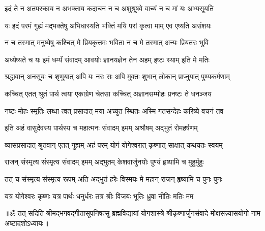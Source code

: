 \twolineshloka
{इदं ते न अतपस्काय न अभक्ताय कदाचन}
{न च अशुश्रूषवे वाच्यं न च मां यः अभ्यसूयति}%

\twolineshloka
{यः इदं परमं गुह्यं मद्भक्तेषु अभिधास्यति}
{भक्तिं मयि परां कृत्वा माम् एव एष्यति असंशयः}%

\twolineshloka
{न च तस्मात् मनुष्येषु कश्चित् मे प्रियकृत्तमः}
{भविता न च मे तस्मात् अन्यः प्रियतरः भुवि}%

\twolineshloka
{अध्येष्यते च यः इमं धर्म्यं संवादम् आवयोः}
{ज्ञानयज्ञेन तेन अहम् इष्टः स्याम् इति मे मतिः}%

\twolineshloka
{श्रद्धावान् अनसूयः च शृणुयात् अपि यः नरः}
{सः अपि मुक्तः शुभान् लोकान् प्राप्नुयात् पुण्यकर्मणाम्}%

\twolineshloka
{कच्चित् एतत् श्रुतं पार्थ त्वया एकाग्रेण चेतसा}
{कच्चित् अज्ञानसम्मोहः प्रनष्टः ते धनञ्जय}%


\twolineshloka
{नष्टः मोहः स्मृतिः लब्धा त्वत् प्रसादात् मया अच्युत}
{स्थितः अस्मि गतसन्देहः करिष्ये वचनं तव}%


\twolineshloka
{इति अहं वासुदेवस्य पार्थस्य च महात्मनः}
{संवादम् इमम् अश्रौषम् अद्भुतं रोमहर्षणम्}%

\twolineshloka
{व्यासप्रसादात् श्रुतवान् एतत् गुह्यम् अहं परम्}
{योगं योगेश्वरात् कृष्णात् साक्षात् कथयतः स्वयम्}%

\twolineshloka
{राजन् संस्मृत्य संस्मृत्य संवादम् इमम् अद्भुतम्}
{केशवार्जुनयोः पुण्यं हृष्यामि च मुहुर्मुहुः}%

\twolineshloka
{तत् च संस्मृत्य संस्मृत्य रूपम् अति अद्भुतं हरेः}
{विस्मयः मे महान् राजन् हृष्यामि च पुनः पुनः}%

\twolineshloka
{यत्र योगेश्वरः कृष्णः यत्र पार्थः धनुर्धरः}
{तत्र श्रीः विजयः भूतिः ध्रुवा नीतिः मतिः मम}%

{॥ॐ तत् सदिति श्रीमद्भगवद्गीतासूपनिषत्सु ब्रह्मविद्यायां योगशास्त्रे श्रीकृष्णार्जुनसंवादे मोक्षसन्न्यासयोगो नाम अष्टादशोऽध्यायः॥}
